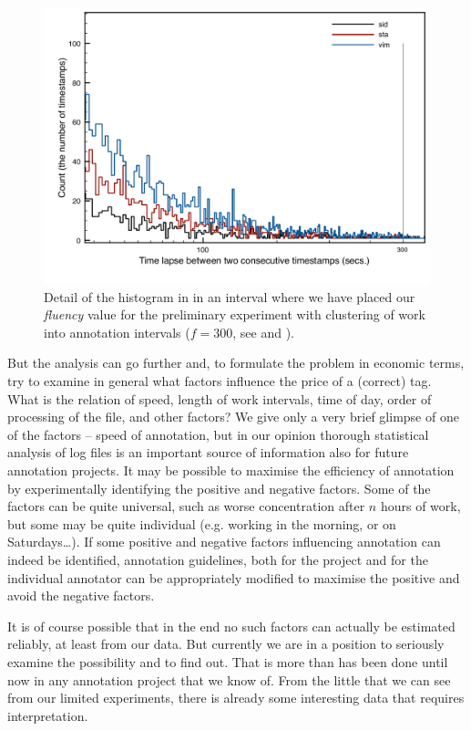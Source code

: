\begin{figure}[htbp]
   \centering
   \includegraphics[width=.8\textwidth]{images/speed/histograms-detail} 
   \caption{Detail of the histogram in  in an interval where we have placed our \emph{fluency} value for the preliminary experiment with clustering of work into annotation intervals ($f=300$, see  and ).}
\label{fig:hist-detail}
\end{figure}


But the analysis can go further and, to formulate the problem in economic terms, try to examine in general what factors influence the price of a (correct) tag. What is the relation of speed, length of work intervals, time of day, order of processing of the file, and other factors? We give only a very brief glimpse of one of the factors -- speed of annotation, but in our opinion thorough statistical analysis of log files is an important source of information also for future annotation projects. It may be possible to maximise the efficiency of annotation by experimentally identifying the positive and negative factors. Some of the factors can be quite universal, such as worse concentration after $n$ hours of work, but some may be quite individual (e.g. working in the morning, or on Saturdays\ldots). If some positive and negative factors influencing annotation can indeed be identified, annotation guidelines, both for the project and for the individual annotator can be appropriately modified to maximise the positive and avoid the negative factors.

It is of course possible that in the end no such factors can actually be estimated reliably, at least from our data. But currently we are in a position to seriously examine the possibility and to find out. That is more than has been done until now in any annotation project that we know of. From the little that we can see from our limited experiments, there is already some interesting data that requires interpretation.
